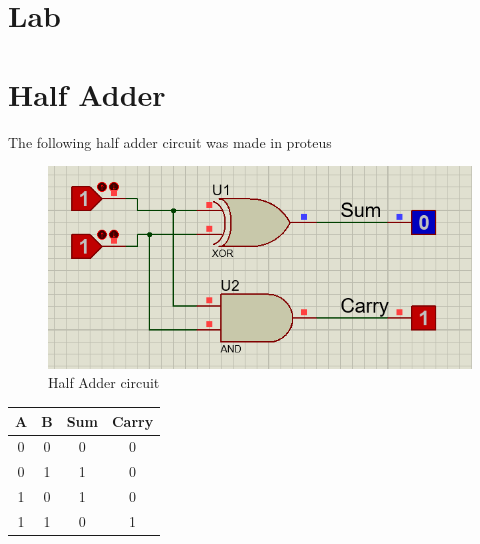 \documentclass[a4paper, 12pt]{article}
\begin{document}
\pagebreak
\section{Lab}
\section{Half Adder}
The following half adder circuit was made in proteus
\begin{figure}[h]
	\centering
	\includegraphics[scale=0.6]{half-adder.png}
	\caption{Half Adder circuit}
\end{figure}
\begin{center}
\begin{tabular}[h]{|c|c|c|c|}
	\hline
	A & B & Sum & Carry \\
	\hline
	0 & 0 & 0 & 0 \\
	0 & 1 & 1 & 0 \\
	1 & 0 & 1 & 0 \\
	1 & 1 & 0 & 1 \\
	\hline
	\end{tabular}
\end{center}
\end{document}
